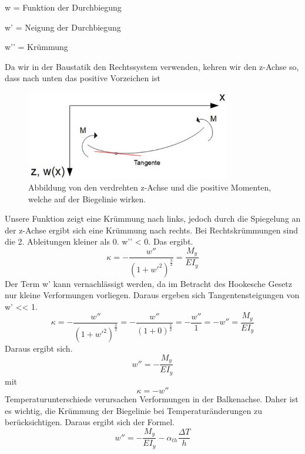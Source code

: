 w = Funktion der Durchbiegung

w’ = Neigung der Durchbiegung

w’’ = Krümmung

Da wir in der Baustatik den Rechtssystem verwenden, kehren wir den z-Achse so, dass nach unten das positive Vorzeichen ist

\begin{figure}
\begin{center}
	\includegraphics[width=0.8\textwidth]{papers/balken/images/teil2/BiegungverdrehteAchsen.jpg}
\end{center}
\caption{Abbildung von den verdrehten z-Achse und die positive Momenten, welche auf der Biegelinie wirken.}
\end{figure}
Unsere Funktion zeigt eine Krümmung nach links, jedoch durch die Spiegelung an der z-Achse ergibt sich eine Krümmung nach rechts.
Bei Rechtskrümmungen sind die 2. Ableitungen kleiner als 0. w’’ < 0.
Das ergibt.
\begin{equation}
	\kappa=
	-\frac{w''}{\left(1+{w'}^2\right)^\frac{3}{2}}=
	\frac{M_y}{EI_y}
\end{equation}
Der Term w’ kann vernachlässigt werden, da im Betracht des Hookesche Gesetz nur kleine Verformungen vorliegen.
Daraus ergeben sich Tangentensteigungen von w’ << 1.
\begin{equation}
	\kappa=
	-\frac{w''}{\left(1+{w'}^2\right)^\frac{3}{2}}=
	-\frac{w''}{\left(1+0\right)^\frac{3}{2}}=
	-\frac{w''}{1}=-w''=
	\frac{M_y}{EI_y}
\end{equation}
Daraus ergibt sich.
\begin{equation}
	w''=
	-\frac{M_y}{EI_y}
\end{equation}
mit
\begin{equation}
	\kappa=
	-w''
\end{equation}
Temperaturunterschiede verursachen Verformungen in der Balkenachse.
Daher ist es wichtig, die Krümmung der Biegelinie bei Temperaturänderungen zu berücksichtigen.
Daraus ergibt sich der Formel.
\begin{equation}
	w''=
	-\frac{M_y}{EI_y}-\alpha_{th}\frac{\Delta T}{h}
\end{equation}

